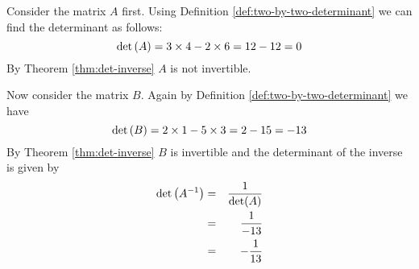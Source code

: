\begin{solution}
Consider the matrix $A$ first. Using Definition \ref{def:two-by-two-determinant} we can find the determinant as follows:
\[
\det \left(A \right) = 3 \times 4 - 2 \times 6 = 12 - 12 = 0
\]
By Theorem \ref{thm:det-inverse} $A$ is not invertible.

Now consider the matrix $B$. Again by Definition \ref{def:two-by-two-determinant} we have 
\[
\det \left(B \right) = 2 \times 1 - 5 \times 3 = 2 - 15 = -13
\]
By Theorem \ref{thm:det-inverse} $B$ is invertible and the determinant of the inverse is given by 
\begin{eqnarray*}
\det \left(A^{-1} \right) &=& \frac{1}{\det(A)} \\
&=& \frac{1}{-13} \\
&=& -\frac{1}{13}
\end{eqnarray*}

\end{solution}
